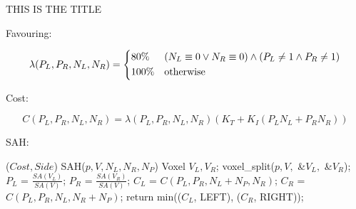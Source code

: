 \documentclass[12pt,letterpaper]{article}
\begin{document}
\doublespacing

\begin{titlepage}
  THIS IS THE TITLE
\end{titlepage}

\begin{paragraph}
  \newline Favouring:
\end{paragraph}
\[
    \lambda( P_L, P_R, N_L, N_R) =
    \begin{dcases}
      80\%  & (N_L\equiv 0 \lor N_R \equiv 0)\land (P_L \neq 1 \land P_R \neq 1)\\
      100\% & \text{otherwise}
    \end{dcases}
\]
\begin{paragraph}
  \newline Cost:
\end{paragraph}
\[
    C(P_L, P_R, N_L, N_R) = \lambda(P_L, P_R, N_L, N_R)(K_T + K_I ( P_LN_L + P_RN_R))
\]
\begin{paragraph}
  \newline SAH:
\end{paragraph}
\begin{algorithm}[caption={Surface Area Heuristic.}, label={alg1}]
  ($Cost, Side$) SAH($p, V, N_L, N_R, N_P$)
  {
    Voxel $V_L, V_R$;
    voxel_split($p, V,$ &$V_L,$ &$V_R$);
    $P_L$ = $\frac{SA(V_L)}{SA(V)}$;
    $P_R$ = $\frac{SA(V_R)}{SA(V)}$;
    $C_L$ = $C(P_L, P_R, N_L+N_P, N_R)$;
    $C_R$ = $C(P_L, P_R, N_L, N_R+N_P)$;
    return min(($C_L$, LEFT), ($C_R$, RIGHT));
  }
\end{algorithm}
\newpage
\end{document}
